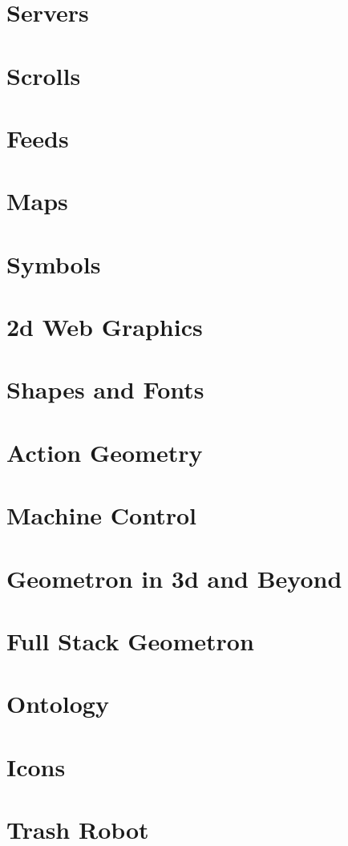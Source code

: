 \documentclass[ebook,12pt,openany]{memoir} %
\begin{document}
\chapter{Servers}

\chapter{Scrolls}

\chapter{Feeds}

\chapter{Maps}

\chapter{Symbols}

\chapter{2d Web Graphics}

\chapter{Shapes and Fonts}

\chapter{Action Geometry}

\chapter{Machine Control}

\chapter{Geometron in 3d and Beyond}

\chapter{Full Stack Geometron}

\chapter{Ontology}

\chapter{Icons}
\chapter{Trash Robot}



\end{document}
